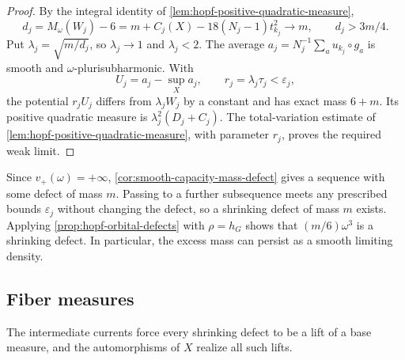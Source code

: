 \begin{proof}
By the integral identity of \cref{lem:hopf-positive-quadratic-measure},
\[
 d_j=M_\omega(W_j)-6
 =m+C_j(X)-18(N_j-1)t_{k_j}^2\longrightarrow m,
 \qquad d_j>3m/4.
\]
Put $\lambda_j=\sqrt{m/d_j}$, so $\lambda_j\to1$ and $\lambda_j<2$. The average $a_j=N_j^{-1}\sum_a u_{k_j}\circ g_a$ is smooth and $\omega$-plurisubharmonic. With
\[
 U_j=a_j-\sup_Xa_j,\qquad r_j=\lambda_j\tau_j<\varepsilon_j,
\]
the potential $r_jU_j$ differs from $\lambda_jW_j$ by a constant and has exact mass $6+m$. Its positive quadratic measure is $\lambda_j^2(D_j+C_j)$. The total-variation estimate of \cref{lem:hopf-positive-quadratic-measure}, with parameter $r_j$, proves the required weak limit.
\end{proof}

Since $v_+(\omega)=+\infty$, \cref{cor:smooth-capacity-mass-defect} gives a sequence with some defect of mass $m$. Passing to a further subsequence meets any prescribed bounds $\varepsilon_j$ without changing the defect, so a shrinking defect of mass $m$ exists. Applying \cref{prop:hopf-orbital-defects} with $\rho=h_G$ shows that $(m/6)\omega^3$ is a shrinking defect. In particular, the excess mass can persist as a smooth limiting density.

\subsection{Fiber measures}

The intermediate currents force every shrinking defect to be a lift of a base measure, and the automorphisms of $X$ realize all such lifts.

